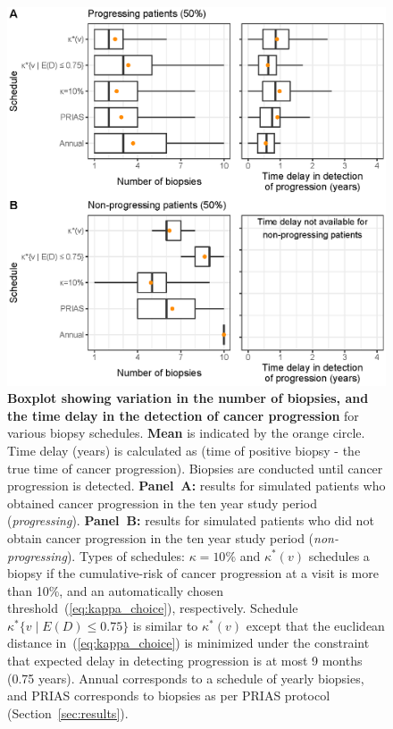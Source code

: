 \begin{figure}
\centerline{\includegraphics{images/simulation_boxplot.eps}}
\caption{\textbf{Boxplot showing variation in the number of biopsies, and the time delay in the detection of cancer progression} for various biopsy schedules. \textbf{Mean} is indicated by the orange circle. Time delay (years) is calculated as (time of positive biopsy - the true time of cancer progression). Biopsies are conducted until cancer progression is detected. \textbf{Panel~A:} results for simulated patients who obtained cancer progression in the ten year study period (\textit{progressing}). \textbf{Panel~B:} results for simulated patients who did not obtain cancer progression in the ten year study period (\textit{non-progressing}). Types of schedules: ${\kappa=10\%}$ and $\kappa^*(v)$ schedules a biopsy if the cumulative-risk of cancer progression at a visit is more than 10\%, and an automatically chosen threshold~(\ref{eq:kappa_choice}), respectively. Schedule ${\kappa^*\{v \mid E(D)\leq 0.75\}}$ is similar to $\kappa^*(v)$ except that the euclidean distance in~(\ref{eq:kappa_choice}) is minimized under the constraint that expected delay in detecting progression is at most 9 months (0.75 years). Annual corresponds to a schedule of yearly biopsies, and PRIAS corresponds to biopsies as per PRIAS protocol (Section~\ref{sec:results}).}
\label{fig:simulation_boxplot}
\end{figure}